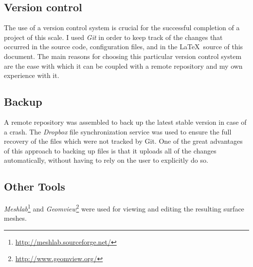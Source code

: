 \documentclass[12pt,a4paper,twoside,openright]{report}
\begin{document}
\subsection{Version control}
The use of a version control system is crucial for the successful completion of a project of this scale. I used \emph{Git} in order to keep track of the changes that occurred in the source code, configuration files, and in the \LaTeX\  source of this document. The main reasons for choosing this particular version control system are the ease with which it can be coupled with a remote repository and my own experience with it.

\subsection{Backup}
A remote repository was assembled to back up the latest stable version in case of a crash. The \emph{Dropbox} file synchronization service was used to ensure the full recovery of the files which were not tracked by Git. One of the great advantages of this approach to backing up files is that it uploads all of the changes automatically, without having to rely on the user to explicitly do so.  
\subsection{Other Tools}
\textit{Meshlab}\footnote{\url{http://meshlab.sourceforge.net/}} and \textit{Geomview}\footnote{\url{http://www.geomview.org/}} were used for  viewing and editing the resulting surface meshes. 
\end{document}
